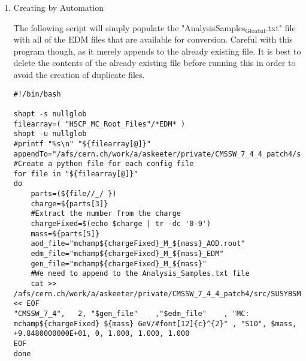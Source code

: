 \documentclass[11pt]{article}
\begin{document}
\begin{enumerate}
In order to produce usable tuples, we must simply run step
one. Step one converts our EDM files to a usable root file. 
Now that the above file has been properly edited, we simply run:

\begin{verbatim}
Launch.py 1
\end{verbatim}

Which will run step 1 of the analysis code. Upon completion, the
data root tuples will be stored in the "Results" folder of the
same directory as Launch. It should be noted that the jobs are
auto-batched to Cern's 2 day queue. 

Once can also run the jobs locally by looking in the "FARM/inputs"
folder. You will see \#\#\#\#$_{\text{HscpAnalysis}}$.sh where the numbers
correspond to the batched job number. Less them and the bottom
lines will tell you what samples they are running on if you're not
sure. Then just do:

\begin{verbatim}
source filename.sh >& output.txt &
\end{verbatim}

To run locally (and redirect the output). Running locally is
usually faster than sending to batch, but if the local running
takes longer than two hours, the job will be killed automatically.

\item Creating by Automation
\label{sec-1-1-4-2}

The following script will simply populate the
"AnalysisSamples$_{\text{Gloabal}}$.txt" file with all of the EDM files that
are available for conversion. Careful with this program though,
as it merely appends to the already existing file. It is best to
delete the contents of the already existing file before running
this in order to avoid the creation of duplicate files. 

\begin{verbatim}
#!/bin/bash

shopt -s nullglob
filearray=( "HSCP_MC_Root_Files"/*EDM* )
shopt -u nullglob
#printf "%s\n" "${filearray[@]}"
appendTo="/afs/cern.ch/work/a/askeeter/private/CMSSW_7_4_4_patch4/src/SUSYBSMAnalysis/HSCP/test/AnalysisCode/Analysis_Samples.txt"
#Create a python file for each config file    
for file in "${filearray[@]}"
do
    parts=(${file//_/ })
    charge=${parts[3]}
    #Extract the number from the charge
    chargeFixed=$(echo $charge | tr -dc '0-9')
    mass=${parts[5]}    
    aod_file="mchamp${chargeFixed}_M_${mass}_AOD.root"
    edm_file="mchamp${chargeFixed}_M_${mass}_EDM"
    gen_file="mchamp${chargeFixed}_M_${mass}"
    #We need to append to the Analysis_Samples.txt file
    cat >> /afs/cern.ch/work/a/askeeter/private/CMSSW_7_4_4_patch4/src/SUSYBSMAnalysis/HSCP/test/AnalysisCode/Analysis_Samples.txt << EOF
"CMSSW_7_4",   2, "$gen_file"    ,"$edm_file"    , "MC: mchamp${chargeFixed} ${mass} GeV/#font[12]{c}^{2}" , "S10", $mass, +9.8480000000E+01, 0, 1.000, 1.000, 1.000
EOF
done
\end{verbatim}


\end{enumerate}
\end{document}
